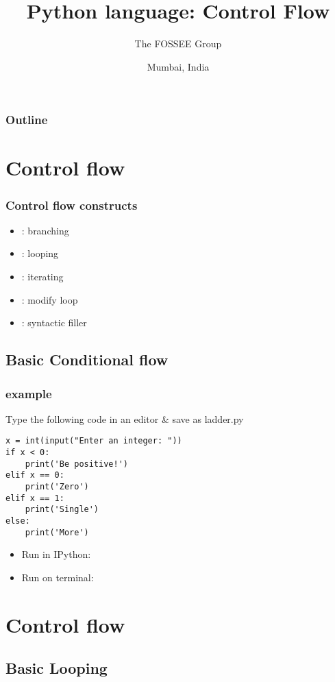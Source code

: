 \documentclass[14pt,compress]{beamer}
\title[Control flow]{Python language: Control Flow}
\author[FOSSEE Team] {The FOSSEE Group}
\institute[FOSSEE -- IITB] {Department of Aerospace Engineering\\IIT Bombay}
\date[] {Mumbai, India}
\begin{document}
\begin{frame}
  \titlepage
\end{frame}

\begin{frame}
  \frametitle{Outline}
  \tableofcontents
\end{frame}

\section{Control flow}

\begin{frame}
  \frametitle{Control flow constructs}
  \begin{itemize}
  \item {}: branching
  \item {}: looping
  \item {}: iterating
  \item {}: modify loop
  \item {}: syntactic filler
  \end{itemize}
\end{frame}

\subsection{Basic Conditional flow}
\begin{frame}[fragile]
  \frametitle{ example}
Type the following code in an editor \& save as \alert{ladder.py}
{  \small
\begin{lstlisting}
x = int(input("Enter an integer: "))
if x < 0:
    print('Be positive!')
elif x == 0:
    print('Zero')
elif x == 1:
    print('Single')
else:
    print('More')
\end{lstlisting}
}
\pause
\begin{itemize}
\item Run in IPython: 
\item Run on terminal: 
\end{itemize}
\end{frame}

\section{Control flow}
\subsection{Basic Looping}
\end{document}
